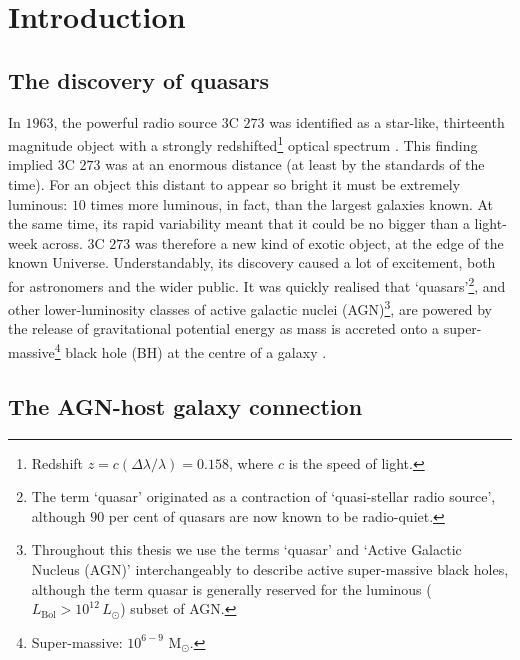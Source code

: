 
\chapter{Introduction}
\label{ch:intro}

\section{The discovery of quasars}

In $1963$, the powerful radio source $3$C $273$ was identified as a star-like, thirteenth magnitude object with a strongly redshifted\footnote{Redshift $z=c(\Delta \lambda/\lambda)=0.158$, where $c$ is the speed of light.} optical spectrum \citep{schmidt63}.
This finding implied $3$C $273$ was at an enormous distance (at least by the standards of the time).
For an object this distant to appear so bright it must be extremely luminous: $10$ times more luminous, in fact, than the largest galaxies known.
At the same time, its rapid variability meant that it could be no bigger than a light-week across.
$3$C $273$ was therefore a new kind of exotic object, at the edge of the known Universe.
Understandably, its discovery caused a lot of excitement, both for astronomers and the wider public.
It was quickly realised that `quasars'\footnote{The term `quasar' originated as a contraction of `quasi-stellar radio source', although $90$ per cent of quasars are now known to be radio-quiet.}, and other lower-luminosity classes of active galactic nuclei (AGN)\footnote{Throughout this thesis we use the terms `quasar' and `Active Galactic Nucleus (AGN)' interchangeably to describe active super-massive black holes, although the term quasar is generally reserved for the luminous ($L_{\text{Bol}} > 10^{12}\,L_{\odot}$) subset of AGN.}, are powered by the release of gravitational potential energy as mass is accreted onto a super-massive\footnote{Super-massive: $10^{6 - 9}$ M$_\odot$.} black hole (BH) at the centre of a galaxy \citep[e.g.][]{hoyle63,salpeter64,lynden-bell69,lynden-bell71}.

\section{The AGN-host galaxy connection}

